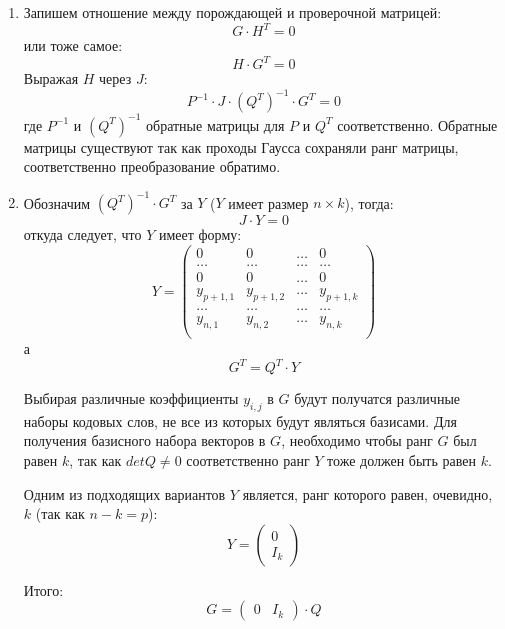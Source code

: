 \begin{enumerate}
 	\item Запишем отношение между порождающей и проверочной матрицей:
 	 \[
 	 	G \cdot H^T = 0
 	 \]
 	 или тоже самое:
 	 \[
 	 	H \cdot G^T = 0
 	 \]
 	 Выражая $H$ через $J$:
 	 \[
 	 	P^{-1} \cdot J \cdot (Q^T)^{-1} \cdot G^T = 0
 	 \]
 	 где $P^{-1}$ и $(Q^T)^{-1}$ обратные матрицы для $P$ и $Q^T$ соответственно. Обратные матрицы существуют
 	 так как проходы Гаусса сохраняли ранг матрицы, соответственно преобразование обратимо.
 	 
 	 \item Обозначим $(Q^T)^{-1} \cdot G^T$ за $Y$ ($Y$ имеет размер $n\times k$), тогда:
 	\[
 		J \cdot Y = 0
 	\]
 	откуда следует, что $Y$ имеет форму:
 	\[
 		Y=\begin{pmatrix}
 			0 & 0 & \ldots & 0 \\
 			\ldots & \ldots & \ldots & \ldots \\
 			0 & 0 & \ldots & 0 \\
 			y_{p+1,1} & y_{p+1,2} & \ldots & y_{p+1,k} \\
 			\ldots & \ldots & \ldots & \ldots \\
 			y_{n,1} & y_{n,2} & \ldots & y_{n,k} \\
 		\end{pmatrix}
 	\]
 	а
 	\[
 	G^T = Q^T \cdot Y
 	\]
 	
 	Выбирая различные коэффициенты $y_{i,j}$ в $G$ будут получатся различные наборы кодовых слов,
 	не все из которых будут являться базисами. Для получения базисного набора векторов в $G$, необходимо
 	чтобы ранг $G$ был равен $k$, так как $det Q \neq 0$ соответственно ранг $Y$ тоже должен быть равен $k$.
 	
 	Одним из подходящих вариантов $Y$ является, ранг которого равен, очевидно, $k$ (так как $n - k = p$):
 	\[
 		Y=\begin{pmatrix}
 			0 \\
 			I_k
 		\end{pmatrix}
 	\]
 	
 	Итого:
 	\[
 	G=\begin{pmatrix}
 		0 & I_k
 	\end{pmatrix} \cdot Q
 	\] 
 \end{enumerate}














